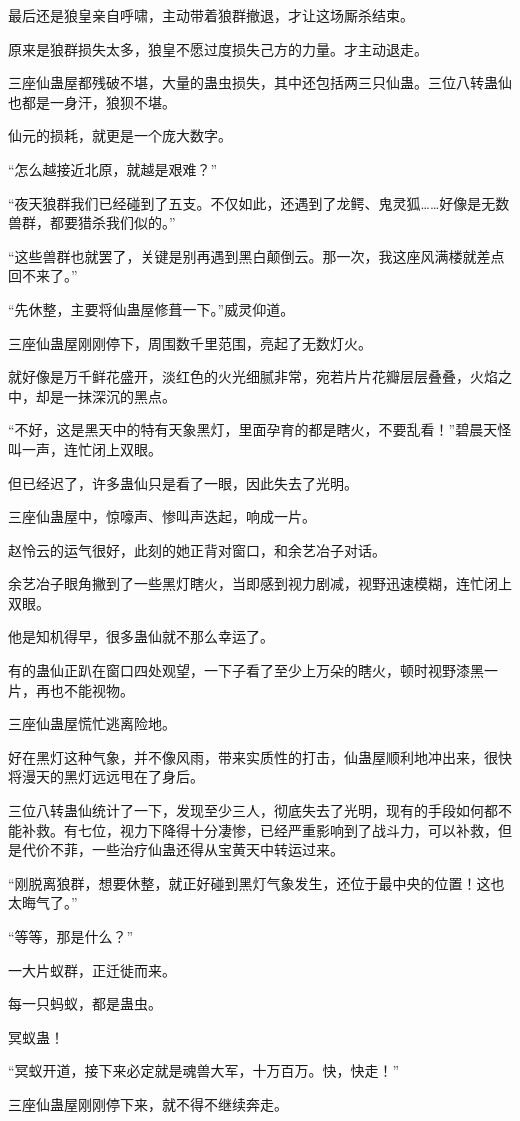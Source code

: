 \begin{this_body}
最后还是狼皇亲自呼啸，主动带着狼群撤退，才让这场厮杀结束。

原来是狼群损失太多，狼皇不愿过度损失己方的力量。才主动退走。

三座仙蛊屋都残破不堪，大量的蛊虫损失，其中还包括两三只仙蛊。三位八转蛊仙也都是一身汗，狼狈不堪。

仙元的损耗，就更是一个庞大数字。

“怎么越接近北原，就越是艰难？”

“夜天狼群我们已经碰到了五支。不仅如此，还遇到了龙鳄、鬼灵狐……好像是无数兽群，都要猎杀我们似的。”

“这些兽群也就罢了，关键是别再遇到黑白颠倒云。那一次，我这座风满楼就差点回不来了。”

“先休整，主要将仙蛊屋修葺一下。”威灵仰道。

三座仙蛊屋刚刚停下，周围数千里范围，亮起了无数灯火。

就好像是万千鲜花盛开，淡红色的火光细腻非常，宛若片片花瓣层层叠叠，火焰之中，却是一抹深沉的黑点。

“不好，这是黑天中的特有天象黑灯，里面孕育的都是瞎火，不要乱看！”碧晨天怪叫一声，连忙闭上双眼。

但已经迟了，许多蛊仙只是看了一眼，因此失去了光明。

三座仙蛊屋中，惊嚎声、惨叫声迭起，响成一片。

赵怜云的运气很好，此刻的她正背对窗口，和余艺冶子对话。

余艺冶子眼角撇到了一些黑灯瞎火，当即感到视力剧减，视野迅速模糊，连忙闭上双眼。

他是知机得早，很多蛊仙就不那么幸运了。

有的蛊仙正趴在窗口四处观望，一下子看了至少上万朵的瞎火，顿时视野漆黑一片，再也不能视物。

三座仙蛊屋慌忙逃离险地。

好在黑灯这种气象，并不像风雨，带来实质性的打击，仙蛊屋顺利地冲出来，很快将漫天的黑灯远远甩在了身后。

三位八转蛊仙统计了一下，发现至少三人，彻底失去了光明，现有的手段如何都不能补救。有七位，视力下降得十分凄惨，已经严重影响到了战斗力，可以补救，但是代价不菲，一些治疗仙蛊还得从宝黄天中转运过来。

“刚脱离狼群，想要休整，就正好碰到黑灯气象发生，还位于最中央的位置！这也太晦气了。”

“等等，那是什么？”

一大片蚁群，正迁徙而来。

每一只蚂蚁，都是蛊虫。

冥蚁蛊！

“冥蚁开道，接下来必定就是魂兽大军，十万百万。快，快走！”

三座仙蛊屋刚刚停下来，就不得不继续奔走。

\end{this_body}


